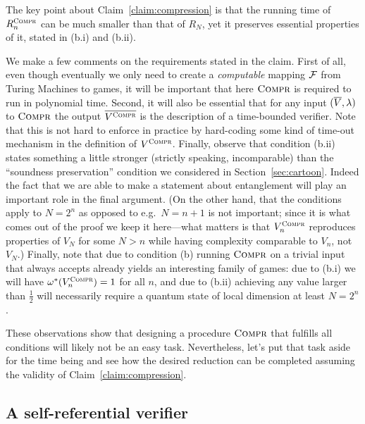 The key point about Claim~\ref{claim:compression} is that the running time of $R_n^{\textsc{Compr}}$ can be much smaller than that of $R_N$, yet it preserves essential properties of it, stated in (b.i) and (b.ii). 

We make a few comments on the requirements stated in the claim. First of all, even though eventually we only need to create a \emph{computable} mapping $\mathcal{F}$ from Turing Machines to games, it will be important that here $\textsc{Compr}$ is required to run in polynomial time. Second, it will also be essential that for any input $(\overline{V},\lambda)$ to $\textsc{Compr}$ the output $\overline{V^{\textsc{Compr}}}$ is the description of a time-bounded verifier. Note that this is not hard to enforce in practice by hard-coding some kind of time-out mechanism in the definition of $V^{\textsc{Compr}}$. Finally, observe that condition (b.ii) states something a little stronger (strictly speaking, incomparable) than the ``soundness preservation'' condition we considered in Section~\ref{sec:cartoon}. Indeed the fact that we are able to make a statement about entanglement will play an important role in the final argument. (On the other hand, that the conditions apply to $N=2^n$ as opposed to e.g.\ $N=n+1$ is not important; since it is what comes out of the proof we keep it here---what matters is that $V_n^{\textsc{Compr}}$ reproduces properties of $V_N$ for some $N>n$ while having complexity comparable to $V_n$, not $V_N$.) Finally, note that due to condition (b) running $\textsc{Compr}$ on a trivial input that always accepts already yields an interesting family of games: due to (b.i) we will have $\omega^*(V^{\textsc{Compr}}_n)=1$ for all $n$, and due to (b.ii) achieving any value larger than $\frac{1}{2}$ will necessarily require a quantum state of local dimension at least $N=2^n$. 

These observations show that designing a procedure $\textsc{Compr}$ that fulfills all conditions will likely not be an easy task. Nevertheless, let's put that task aside for the time being and see how the desired reduction can be completed assuming the validity of Claim~\ref{claim:compression}.

\subsection{A self-referential verifier}
\label{sec:self-ref}

